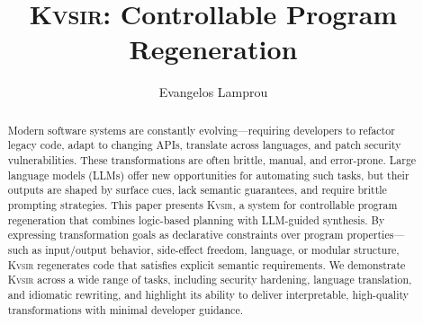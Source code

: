 \documentclass[noacm,sigplan,review]{acmart}
\newcommand{\sys}{{\scshape Kv{\textalpha}sir}\xspace}
\begin{document}
\title{\sys: Controllable Program Regeneration}
\author{Evangelos Lamprou}



\begin{abstract}
Modern software systems are constantly evolving—requiring developers to
  refactor legacy code, adapt to changing APIs, translate across languages, and
  patch security vulnerabilities. These transformations are often brittle,
  manual, and error-prone. Large language models (LLMs) offer new opportunities
  for automating such tasks, but their outputs are shaped by surface cues, lack
  semantic guarantees, and require brittle prompting strategies. This paper
  presents \sys, a system for controllable program regeneration that combines
  logic-based planning with LLM-guided synthesis.
  By expressing transformation
  goals as declarative constraints over program properties---such as input/output
  behavior, side-effect freedom, language, or modular structure, \sys
  regenerates code that satisfies explicit semantic requirements.
  We demonstrate \sys across a wide range of tasks, including security
  hardening, language translation, and idiomatic rewriting, and highlight its
  ability to deliver interpretable, high-quality transformations with minimal
  developer guidance.
\end{abstract}
\maketitle
\end{document}

